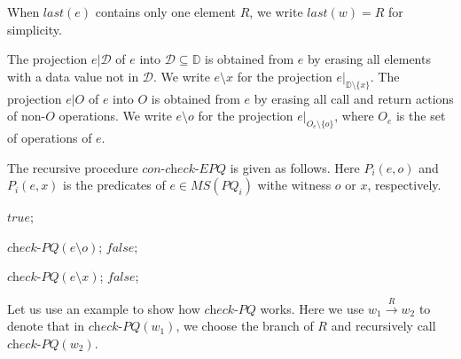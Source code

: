When $\textit{last}(e)$ contains only one element $R$, we write $\textit{last}(w)=R$ for simplicity.

The projection $e \vert{\mathcal{D}}$ of $e$ into $\mathcal{D} \subseteq \mathbb{D}$ is obtained from $e$ by erasing all elements with a data value not in $\mathcal{D}$. We write $e \setminus x$ for the projection $e \vert_{ \mathbb{D} \setminus \{ x \} }$. The projection $e \vert{O}$ of $e$ into $O$ is obtained from $e$ by erasing all call and return actions of non-$O$ operations. We write $e \setminus o$ for the projection $e \vert_{ O_e \setminus \{ o \} }$, where $O_e$ is the set of operations of $e$.

The recursive procedure $\textit{con-check-EPQ}$ is given as follows. Here $P_i(e,o)$ and $P_i(e,x)$ is the predicates of $e \in \textit{MS}(\textit{PQ}_i)$ withe witness $o$ or $x$, respectively.

\begin{algorithm}[H]

{\KwRet $\textit{true}$;}

{
    {
        \KwRet $\textit{check-PQ}(e \setminus o)$;
    }
    \KwRet $\textit{false}$;
}

{
    {
        \KwRet $\textit{check-PQ}(e \setminus x)$;
    }
    \KwRet $\textit{false}$;
}
\caption{$\textit{check-PQ}$}
\label{Method-check-PQ}
\end{algorithm}

Let us use an example to show how $\textit{check-PQ}$ works. Here we use $w_1 \xrightarrow{R} w_2$ to denote that in $\textit{check-PQ}(w_1)$, we choose the branch of $R$ and recursively call $\textit{check-PQ}(w_2)$.

